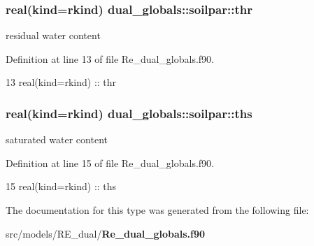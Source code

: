 \subsubsection[{thr}]{\setlength{\rightskip}{0pt plus 5cm}real(kind=rkind) dual\+\_\+globals\+::soilpar\+::thr}\label{structdual__globals_1_1soilpar_a2855a7395b9673162e91aae5c1c97a05}


residual water content 



Definition at line 13 of file Re\+\_\+dual\+\_\+globals.\+f90.


\begin{DoxyCode}
13     \textcolor{keywordtype}{real(kind=rkind)} :: thr
\end{DoxyCode}
\subsubsection[{ths}]{\setlength{\rightskip}{0pt plus 5cm}real(kind=rkind) dual\+\_\+globals\+::soilpar\+::ths}\label{structdual__globals_1_1soilpar_aea95fbbfe366bfada314d6a1f28fdaad}


saturated water content 



Definition at line 15 of file Re\+\_\+dual\+\_\+globals.\+f90.


\begin{DoxyCode}
15     \textcolor{keywordtype}{real(kind=rkind)} :: ths
\end{DoxyCode}


The documentation for this type was generated from the following file\+:\begin{DoxyCompactItemize}
\item 
src/models/\+R\+E\+\_\+dual/{\bf Re\+\_\+dual\+\_\+globals.\+f90}\end{DoxyCompactItemize}
